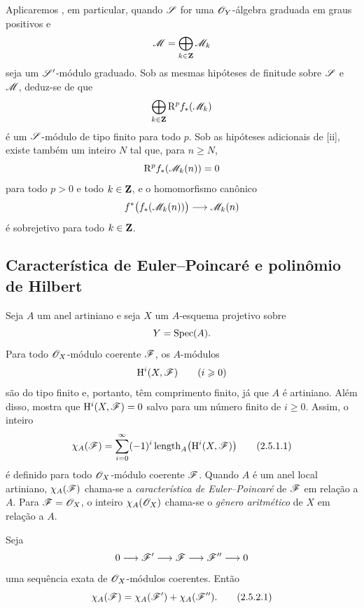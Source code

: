 \begin{env}[2.4.2]
\label{III.2.4.2}
Aplicaremos , em particular, quando $\mathscr{S}$ for uma $\mathscr{O}_Y$-álgebra graduada em graus positivos e
\[
  \mathscr{M}=\bigoplus_{k\in\mathbf Z}\mathscr{M}_k
\]
seja um $\mathscr{S}'$-módulo graduado.
Sob as mesmas hipóteses de finitude sobre $\mathscr{S}$ e $\mathscr{M}$, deduz-se de  que
\[
  \bigoplus_{k\in\mathbf Z}\mathrm{R}^p f_*(\mathscr{M}_k)
\]
é um $\mathscr{S}$-módulo de tipo finito para todo $p$.
Sob as hipóteses adicionais de [ii], existe também um inteiro $N$ tal que, para $n\geq N$,
\[
  \mathrm{R}^p f_*(\mathscr{M}_k(n))=0
\]
para todo $p>0$ e todo $k\in\mathbf Z$, e o homomorfismo canônico
\[
  f^*\bigl(f_*(\mathscr{M}_k(n))\bigr)
  \longrightarrow
  \mathscr{M}_k(n)
\]
é sobrejetivo para todo $k\in\mathbf Z$.
\end{env}


\subsection{Característica de Euler--Poincar\'e e polinômio de Hilbert}
\label{subsection:III.2.5}

\begin{env}[2.5.1]
\label{III.2.5.1}
Seja $A$ um anel artiniano e seja $X$ um $A$-esquema projetivo sobre
\[
  Y=\operatorname{Spec}(A).
\]
Para todo $\mathscr{O}_X$-módulo coerente $\mathscr{F}$, os $A$-módulos
\[
  \mathrm{H}^i(X,\mathscr{F})\qquad(i\geqslant0)
\]
são do tipo finito  e, portanto, têm comprimento finito, já que $A$ é artiniano.
Além disso,  mostra que $\mathrm{H}^i(X,\mathscr{F})=0$ salvo para um número finito de $i\geq0$.
Assim, o inteiro
\[
\label{III.2.5.1.1}
  \chi_A(\sh{F})
  =
  \sum_{i=0}^{\infty}
  (-1)^i\operatorname{length}_A\bigl(\HH^i(X,\sh{F})\bigr)
  \tag{2.5.1.1}
\]
é definido para todo $\mathscr{O}_X$-módulo coerente $\mathscr{F}$.
Quando $A$ é um anel local artiniano, $\chi_A(\mathscr{F})$ chama-se a \emph{característica de Euler--Poincar\'e} de $\mathscr{F}$ em relação a $A$.
Para $\mathscr{F}=\mathscr{O}_X$, o inteiro $\chi_A(\mathscr{O}_X)$ chama-se o \emph{gênero aritmético} de $X$ em relação a $A$.
\end{env}

\begin{proposition}[2.5.2]
\label{III.2.5.2}
Seja
\[
  0\longrightarrow\mathscr{F}'
  \longrightarrow\mathscr{F}
  \longrightarrow\mathscr{F}''
  \longrightarrow0
\]
uma sequência exata de $\mathscr{O}_X$-módulos coerentes.
Então
\[
\label{III.2.5.2.1}
  \chi_A(\sh{F})
  =
  \chi_A(\sh{F}')+\chi_A(\sh{F}'').
  \tag{2.5.2.1}
\]
\end{proposition}

